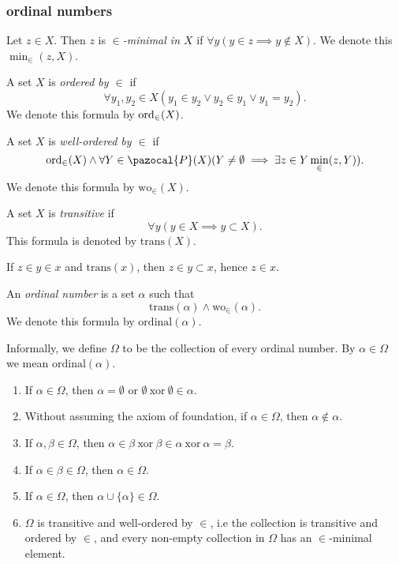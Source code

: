 \subsubsection{ordinal numbers}
\begin{definition}
    Let $z\in X$. Then $z$ is \textit{$\in$-minimal in $X$} if $\forall y(y\in z \implies y\notin X)$. We denote this $\min_\in(z,X)$.
\end{definition}
\begin{definition}
    A set $X$ is \textit{ordered by $\in$} if 
    $$\forall y_1,y_2\in X(y_1\in y_2\vee y_2\in y_1 \vee y_1=y_2).$$
    We denote this formula by $\mathrm{ord}_\in(X)$.
\end{definition}
\begin{definition}
    A set $X$ is \textit{well-ordered by $\in$} if 
    $$ \ord_\in(X) \wedge \forall Y \in \pazocal{P}(X)(Y\neq \emptyset \implies \exists z \in Y \min_\in(z,Y)).$$
    We denote this formula by $\mathrm{wo}_\in(X)$.
\end{definition}
\begin{definition}
    A set $X$ is \textit{transitive} if 
    $$\forall y(y\in X \implies y\subset X).$$
    This formula is denoted by $\mathrm{trans}(X)$. 
\end{definition}
\begin{remark}
    If $z\in y\in x$ and $\mathrm{trans}(x)$, then $z\in y\subset x$, hence $z\in x$. 
\end{remark}
\begin{definition}
    An \textit{ordinal number} is a set $\alpha$ such that 
    $$\mathrm{trans}(\alpha)\wedge \mathrm{wo}_\in(\alpha).$$
    We denote this formula by $\mathrm{ordinal}(\alpha)$.
\end{definition}
\begin{remark}
    Informally, we define $\Omega$ to be the collection of every ordinal number. By $\alpha\in\Omega$ we mean $\mathrm{ordinal}(\alpha)$. 
\end{remark}
\begin{theorem}
    \begin{enumerate}
        \item If $\alpha\in \Omega$, then $\alpha=\emptyset$ or $\emptyset\ \mathrm{xor}\ \emptyset\in\alpha$.
        \item Without assuming the axiom of foundation, if $\alpha\in \Omega$, then $\alpha\notin \alpha$.
        \item If $\alpha,\beta\in \Omega$, then $\alpha\in \beta\ \mathrm{ xor }\ \beta\in \alpha \ \mathrm{ xor } \ \alpha = \beta$.
        \item  If $\alpha \in \beta \in \Omega$, then $\alpha\in \Omega$.
        \item If $\alpha\in\Omega$, then $\alpha\cup\{\alpha\} \in \Omega$.
        \item $\Omega$ is transitive and well-ordered by $\in$, i.e the collection is transitive and ordered by $\in$, and every non-empty collection in $\Omega$ has an $\in$-minimal element.
    \end{enumerate}
\end{theorem}
